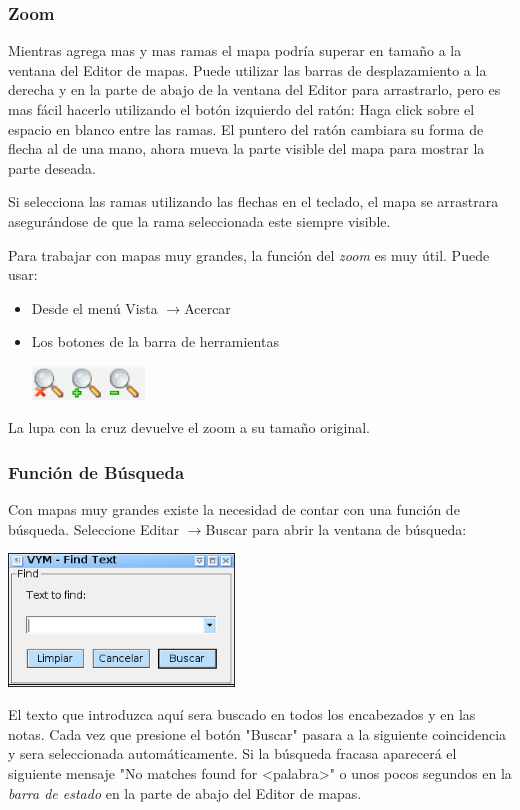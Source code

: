 \documentclass{article}
\newcommand{\ra}{$\longrightarrow$}
\begin{document}
\subsubsection*{Zoom}
Mientras agrega mas y mas ramas el mapa podr\'ia superar en tama\~no a la ventana del Editor de mapas. Puede utilizar las barras de desplazamiento a la derecha y en la parte de abajo de la ventana del Editor para arrastrarlo, pero es mas f\'acil hacerlo utilizando el bot\'on izquierdo del rat\'on: Haga click sobre el espacio en blanco entre las ramas. El puntero del rat\'on cambiara su forma de flecha al de una mano, ahora mueva la parte visible del mapa para mostrar la parte deseada.

Si selecciona las ramas utilizando las flechas en el teclado, el mapa se arrastrara asegur\'andose de que la rama seleccionada este siempre visible.

Para trabajar con mapas muy grandes, la funci\'on del {\em zoom} es muy \'util. Puede usar:

\begin{itemize}
    \item Desde el men\'u Vista \ra Acercar
    \item Los botones de la barra de herramientas 
        \begin{center}
            \includegraphics[width=3cm]{images/zoom-buttons.png}
        \end{center}    
\end{itemize}   

La lupa con la cruz devuelve el zoom a su tama\~no original.


\subsubsection*{Funci\'on de B\'usqueda} \label{findwindow}
Con mapas muy grandes existe la necesidad de contar con una funci\'on de b\'usqueda. Seleccione Editar \ra Buscar para abrir la ventana de b\'usqueda:
\begin{center}
    \includegraphics[width=6cm]{images/find-window_es.png}
\end{center}
El texto que introduzca aqu\'i sera buscado en todos los encabezados y en las notas. Cada vez que presione el bot\'on "Buscar" pasara a la siguiente coincidencia y sera seleccionada autom\'aticamente. Si la b\'usqueda fracasa aparecer\'a el siguiente mensaje "No matches found for <palabra>" o unos pocos segundos en la {\em barra de estado} en la parte de abajo del Editor de mapas. 
\end{document}
